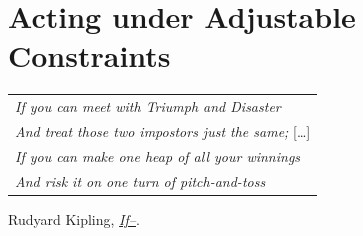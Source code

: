 
\graphicspath{{2-Chapters/5-Chapter/}}

\chapter{Acting under Adjustable Constraints}
\label{chapter:5}

\begin{flushright}
	\begin{tabular}{@{}l@{}}
		\emph{If you can meet with Triumph and Disaster}\\
		\emph{And treat those two impostors just the same;} [\dots]\\
		\emph{If you can make one heap of all your winnings}\\
		\emph{And risk it on one turn of pitch-and-toss}\\
	\end{tabular}

	Rudyard Kipling, \href{https://eleurent.github.io/sisyphe/texts/if-.html}{\emph{If--}}.
\end{flushright}

%


